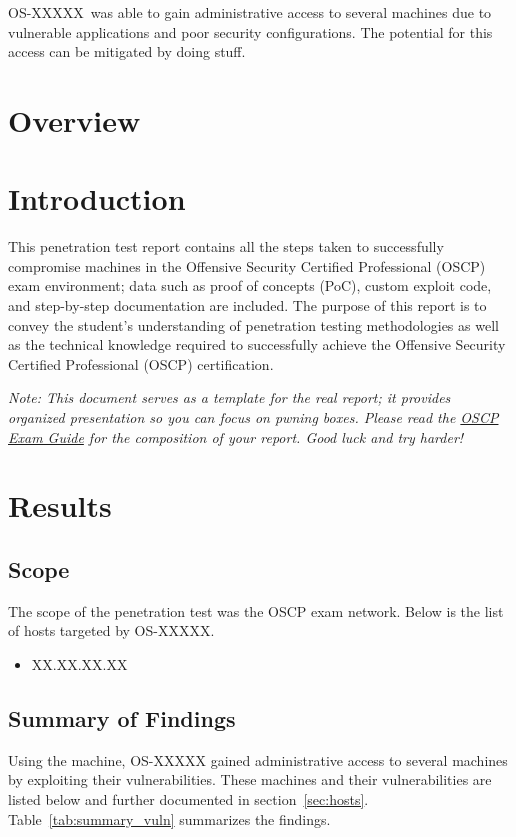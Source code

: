\documentclass[a4paper, 10pt, oneside]{article}
\newcommand{\osid}{OS-XXXXX}
\begin{document}
\par \osid\ was able to gain administrative access to several machines due to vulnerable applications and poor security configurations. The potential for this access can be mitigated by doing stuff.

\section{Overview}
\section{Introduction}
This penetration test report contains all the steps taken to successfully compromise machines in the Offensive Security Certified Professional (OSCP) exam environment; data such as proof of concepts (PoC), custom exploit code, and step-by-step documentation are included. The purpose of this report is to convey the student's understanding of penetration testing methodologies as well as the technical knowledge required to successfully achieve the Offensive Security Certified Professional (OSCP) certification.

\textit{Note: This document serves as a template for the real report; it provides organized presentation so you can focus on pwning boxes. Please read the \href{https://support.offensive-security.com/oscp-exam-guide/}{OSCP Exam Guide} for the composition of your report. Good luck and try harder!}

\section{Results}
\subsection{Scope}
The scope of the penetration test was the OSCP exam network. Below is the list of hosts targeted by \osid.
\begin{itemize}
	\item XX.XX.XX.XX
\end{itemize}


\subsection{Summary of Findings}

Using the \client{} machine, \osid{} gained administrative access to several machines by exploiting their vulnerabilities. These machines and their vulnerabilities are listed below and further documented in section~\ref{sec:hosts}. Table~\ref{tab:summary_vuln} summarizes the findings.
\end{document}
